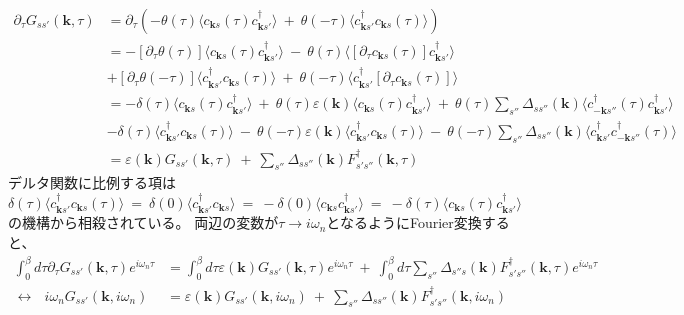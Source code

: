 \documentclass[a4j]{jsarticle}
\begin{document}
\begin{align}
	\partial_{\tau} G_{ss'}(\bm{k} , \tau)
	 & =
	\partial_{\tau}
	\left(
	-
	\theta(\tau)
	\langle c_{\bm{k}s}(\tau) c_{\bm{k} s'}^{\dagger} \rangle
	\ + \
	\theta(- \tau)
	\langle c_{\bm{k} s'}^{\dagger} c_{\bm{k}s}(\tau) \rangle
	\right)
	\nonumber \\[4mm] &=
	-
	[\partial_{\tau} \theta(\tau) ]
	\langle c_{\bm{k}s}(\tau) c_{\bm{k} s'}^{\dagger} \rangle
	\ - \
	\theta(\tau)
	\langle
	[
		\partial_{\tau}
		c_{\bm{k}s}(\tau)
	]
	c_{\bm{k} s'}^{\dagger} \rangle
	\nonumber \\[2mm] &
	+
	[\partial_{\tau} \theta(- \tau) ]
	\langle c_{\bm{k} s'}^{\dagger} c_{\bm{k}s}(\tau) \rangle
	\ + \
	\theta(- \tau)
	\langle c_{\bm{k} s'}^{\dagger}
		[
			\partial_{\tau}
			c_{\bm{k}s}(\tau)
		]
	\rangle
	\nonumber \\[4mm] &=
	-
	\delta(\tau)
	\langle c_{\bm{k}s}(\tau) c_{\bm{k} s'}^{\dagger} \rangle
	\ + \
	\theta(\tau)
	\varepsilon( \bm{k} )
	\langle
	c_{\bm{k} s} (\tau)
	c_{\bm{k} s'}^{\dagger}
	\rangle
	\ + \
	\theta(\tau)
	\sum_{ s'' }
	\Delta_{ s s'' }( \bm{k} )
	\langle
	c_{ - \bm{k} s''}^{\dagger}(\tau)
	c_{\bm{k} s'}^{\dagger}
	\rangle
	\nonumber \\[2mm] &
	-
	\delta ( \tau )
	\langle c_{\bm{k} s'}^{\dagger} c_{\bm{k}s}(\tau) \rangle
	\ - \
	\theta(- \tau)
	\varepsilon( \bm{k} )
	\langle
	c_{\bm{k} s'}^{\dagger}
	c_{\bm{k} s} (\tau)
	\rangle
	\ - \
	\theta(-\tau)
	\sum_{ s'' }
	\Delta_{ s s'' }( \bm{k} )
	\langle
	c_{\bm{k} s'}^{\dagger}
	c_{ - \bm{k} s''}^{\dagger}(\tau)
	\rangle
	\nonumber \\[2mm] &=
	\varepsilon( \bm{k} )
	G_{ss'}(\bm{k} , \tau)
	\ + \
	\sum_{s''}
	\Delta_{ s s'' }( \bm{k} )
	F_{ s' s'' }^{\dagger} ( \bm{k} , \tau)
\end{align}
デルタ関数に比例する項は
$$
	\delta ( \tau )
	\langle c_{\bm{k} s'}^{\dagger} c_{\bm{k}s}(\tau) \rangle
	\ = \
	\delta ( 0 )
	\langle c_{\bm{k} s'}^{\dagger} c_{\bm{k}s} \rangle
	\ = \
	-
	\delta ( 0 )
	\langle c_{\bm{k}s} c_{\bm{k} s'}^{\dagger} \rangle
	\ = \
	-
	\delta ( \tau )
	\langle c_{\bm{k}s}(\tau) c_{\bm{k} s'}^{\dagger} \rangle
$$
の機構から相殺されている。
両辺の変数が$\tau \to i \omega_{n}$となるようにFourier変換すると、
\begin{align}
	\int^{\beta}_{0} d \tau
	\partial_{\tau}
	G_{ss'}(\bm{k} , \tau)
	e^{i \omega_{n} \tau}
	 & =
	\int^{\beta}_{0} d \tau
	\varepsilon( \bm{k} )
	G_{ss'}(\bm{k} , \tau)
	e^{i \omega_{n} \tau}
	\ + \
	\int^{\beta}_{0} d \tau
	\sum_{s''}
	\Delta_{ s'' s }( \bm{k} )
	F_{ s' s'' }^{\dagger} ( \bm{k} , \tau)
	e^{i \omega_{n} \tau}
	\nonumber \\[2mm]
	\longleftrightarrow \ \ \
	i \omega_{n}
	G_{ss'}(\bm{k} , i \omega_{n} )
	 & =
	\varepsilon( \bm{k} )
	G_{ss'}(\bm{k} , i \omega_{n} )
	\ + \
	\sum_{s''}
	\Delta_{ s s'' }( \bm{k} )
	F_{ s' s'' }^{\dagger} ( \bm{k} , i \omega_{n} )
\end{align}
\end{document}
